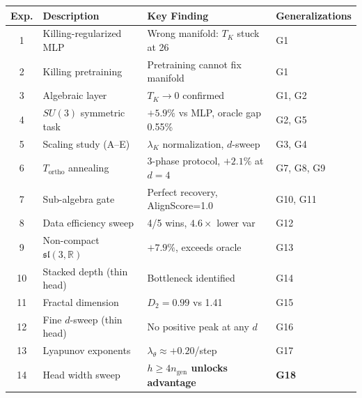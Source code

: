 \documentclass[11pt,a4paper]{article}
\newcommand{\fksl}{\mathfrak{sl}}
\newcommand{\RR}{\mathbb{R}}
\newcommand{\TK}{T_K}
\newcommand{\Tortho}{T_{\mathrm{ortho}}}
\newcommand{\ngen}{n_{\mathrm{gen}}}
\theoremstyle{definition}
\begin{document}
\begin{table}[H]
\centering
\small
\begin{tabular}{clll}
\toprule
Exp. & Description & Key Finding & Generalizations \\
\midrule
1  & Killing-regularized MLP        & Wrong manifold: $\TK$ stuck at 26  & G1 \\
2  & Killing pretraining             & Pretraining cannot fix manifold    & G1 \\
3  & Algebraic layer                 & $\TK \to 0$ confirmed              & G1, G2 \\
4  & $SU(3)$ symmetric task          & $+5.9\%$ vs MLP, oracle gap 0.55\% & G2, G5 \\
5  & Scaling study (A--E)            & $\lambda_K$ normalization, $d$-sweep & G3, G4 \\
6  & $\Tortho$ annealing             & 3-phase protocol, $+2.1\%$ at $d=4$ & G7, G8, G9 \\
7  & Sub-algebra gate                & Perfect recovery, AlignScore=1.0  & G10, G11 \\
8  & Data efficiency sweep           & 4/5 wins, $4.6\times$ lower var   & G12 \\
9  & Non-compact $\fksl(3,\RR)$      & $+7.9\%$, exceeds oracle           & G13 \\
10 & Stacked depth (thin head)       & Bottleneck identified              & G14 \\
11 & Fractal dimension               & $D_2 = 0.99$ vs 1.41              & G15 \\
12 & Fine $d$-sweep (thin head)      & No positive peak at any $d$        & G16 \\
13 & Lyapunov exponents              & $\lambda_\theta \approx +0.20$/step & G17 \\
14 & Head width sweep                & \textbf{$h \geq 4\ngen$ unlocks advantage} & \textbf{G18} \\
\bottomrule
\end{tabular}
\end{table}




\end{document}
